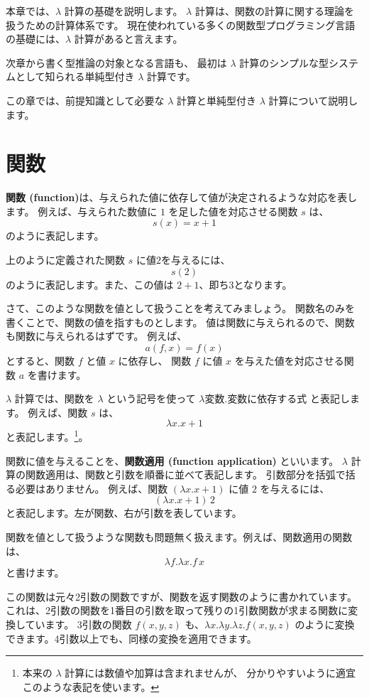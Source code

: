 
本章では、$\lambda$ 計算の基礎を説明します。
$\lambda$ 計算は、関数の計算に関する理論を扱うための計算体系です。
現在使われている多くの関数型プログラミング言語の基礎には、$\lambda$ 計算があると言えます。

次章から書く型推論の対象となる言語も、
最初は $\lambda$ 計算のシンプルな型システムとして知られる単純型付き $\lambda$ 計算です。

この章では、前提知識として必要な $\lambda$ 計算と単純型付き $\lambda$ 計算について説明します。

\section{関数}

\textbf{関数 (function)}は、与えられた値に依存して値が決定されるような対応を表します。
例えば、与えられた数値に $1$ を足した値を対応させる関数 $s$ は、
\[
  s(x) = x+1
\]
のように表記します。

上のように定義された関数 $s$ に値$2$を与えるには、
\[
  s(2)
\]
のように表記します。また、この値は $2+1$、即ち$3$となります。

さて、このような関数を値として扱うことを考えてみましょう。
関数名のみを書くことで、関数の値を指すものとします。
値は関数に与えられるので、関数も関数に与えられるはずです。
例えば、
\[
  a(f, x) = f(x)
\]
とすると、関数 $f$ と値 $x$ に依存し、
関数 $f$ に値 $x$ を与えた値を対応させる関数 $a$ を書けます。

$\lambda$ 計算では、関数を $\lambda$ という記号を使って
$\lambda \text{変数} . \text{変数に依存する式}$ と表記します。
例えば、関数 $s$ は、
\[
  \lambda x . x + 1
\]
と表記します。\footnote{本来の $\lambda$ 計算には数値や加算は含まれませんが、
分かりやすいように適宜このような表記を使います。}。

関数に値を与えることを、\textbf{関数適用 (function application)} といいます。
$\lambda$ 計算の関数適用は、関数と引数を順番に並べて表記します。
引数部分を括弧で括る必要はありません。
例えば、関数 $(\lambda x . x + 1)$ に値 $2$ を与えるには、
\[
  (\lambda x . x + 1) \, 2
\]
と表記します。左が関数、右が引数を表しています。

関数を値として扱うような関数も問題無く扱えます。例えば、関数適用の関数は、
\[
  \lambda f . \lambda x . f \, x
\]
と書けます。

この関数は元々2引数の関数ですが、関数を返す関数のように書かれています。
これは、2引数の関数を1番目の引数を取って残りの1引数関数が求まる関数に変換しています。
3引数の関数 $f(x, y, z)$ も、$\lambda x . \lambda y . \lambda z . f(x, y, z)$
のように変換できます。4引数以上でも、同様の変換を適用できます。

